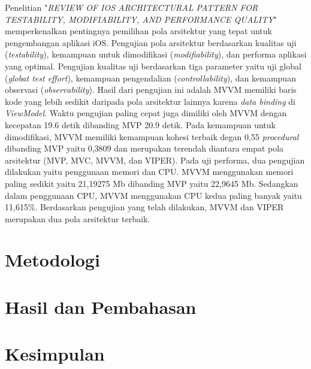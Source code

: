 \documentclass[conference]{IEEEtran}
\begin{document}
    Penelitian "\textit{REVIEW OF IOS ARCHITECTURAL PATTERN FOR
    TESTABILITY, MODIFIABILITY, AND PERFORMANCE QUALITY}" \cite{fz2019} memperkenalkan pentingnya pemilihan pola arsitektur yang tepat untuk pengembangan aplikasi iOS. Pengujian pola arsitektur berdasarkan kualitas uji (\textit{testability}), kemampuan untuk dimodifikasi (\textit{modifiability}), dan performa aplikasi yang optimal. Pengujian kualitas uji berdasarkan tiga parameter yaitu uji global (\textit{globat test effort}), kemampuan pengendalian (\textit{controllability}), dan kemampuan observasi (\textit{observability}). Hasil dari pengujian ini adalah MVVM memiliki baris kode yang lebih sedikit daripada pola arsitektur lainnya karena \textit{data binding} di \textit{ViewModel}. Waktu pengujian paling cepat juga dimiliki oleh MVVM dengan kecepatan 19.6 detik dibanding MVP 20.9 detik. Pada kemampuan untuk dimodifikasi, MVVM memiliki kemampuan kohesi terbaik degan 0,55 \textit{procedural} dibanding MVP yaitu 0,3809 dan merupakan terendah diantara empat pola arsitektur (MVP, MVC, MVVM, dan VIPER). Pada uji performa, dua pengujian dilakukan yaitu penggunaan memori dan CPU. MVVM menggunakan memori paling sedikit yaitu 21,19275 Mb dibanding MVP yaitu 22,9645 Mb. Sedangkan dalam penggunaan CPU, MVVM menggunakan CPU kedua paling banyak yaitu 11,615\%. Berdasarkan pengujian yang telah dilakukan, MVVM dan VIPER merupakan dua pola arsitektur terbaik.
	
	\section{Metodologi}

	
	\section{Hasil dan Pembahasan}

	
	\section{Kesimpulan}
	

\end{document}
